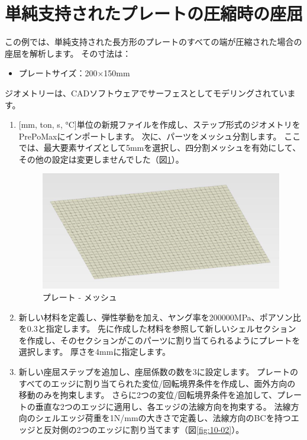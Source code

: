 \section{単純支持されたプレートの圧縮時の座屈}
この例では、単純支持された長方形のプレートのすべての端が圧縮された場合の座屈を解析します。
その寸法は：
\begin{itemize}
\item プレートサイズ：200$\times$150mm
\end{itemize}
ジオメトリーは、CADソフトウェアでサーフェスとしてモデリングされています。
\begin{enumerate}
\item
	{[}mm, ton, s, °C{]}単位の新規ファイルを作成し、ステップ形式のジオメトリをPrePoMaxにインポートします。
	次に、パーツをメッシュ分割します。
	ここでは、最大要素サイズとして5mmを選択し、四分割メッシュを有効にして、その他の設定は変更しませんでした（図\ref{fig:10-01}）。
	\begin{figure}[H]
	\centering
	\includegraphics[width=133mm]{fig/10-01.png}
	\caption{プレート - メッシュ}
	\label{fig:10-01}
	\end{figure}
	\vspace{-\baselineskip}
\item
  新しい材料を定義し、弾性挙動を加え、ヤング率を200000MPa、ポアソン比を0.3と指定します。
  先に作成した材料を参照して新しいシェルセクションを作成し、そのセクションがこのパーツに割り当てられるようにプレートを選択します。
  厚さを4mmに指定します。
\item
  新しい座屈ステップを追加し、座屈係数の数を3に設定します。
  プレートのすべてのエッジに割り当てられた変位/回転境界条件を作成し、面外方向の移動のみを拘束します。
  さらに2つの変位/回転境界条件を追加して、プレートの垂直な2つのエッジに適用し、各エッジの法線方向を拘束する。
  法線方向のシェルエッジ荷重を1N/mmの大きさで定義し、法線方向のBCを持つエッジと反対側の2つのエッジに割り当てます（図\ref{fig:10-02}）。

\end{enumerate}
